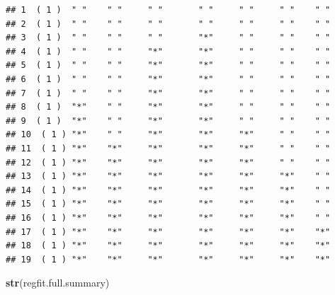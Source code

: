 \documentclass[
  12pt,
]{book}
\newenvironment{Shaded}{\begin{snugshade}}{\end{snugshade}}
\newcommand{\KeywordTok}[1]{\textcolor[rgb]{0.13,0.29,0.53}{\textbf{#1}}}
\newcommand{\NormalTok}[1]{#1}
\theoremstyle{definition}
\theoremstyle{definition}
\theoremstyle{definition}
\theoremstyle{remark}
\begin{document}
\begin{verbatim}
## 1  ( 1 )  " "    " "     " "       " "     " "     " "    " "       
## 2  ( 1 )  " "    " "     " "       " "     " "     " "    " "       
## 3  ( 1 )  " "    " "     " "       "*"     " "     " "    " "       
## 4  ( 1 )  " "    " "     "*"       "*"     " "     " "    " "       
## 5  ( 1 )  " "    " "     "*"       "*"     " "     " "    " "       
## 6  ( 1 )  " "    " "     "*"       "*"     " "     " "    " "       
## 7  ( 1 )  " "    " "     "*"       "*"     " "     " "    " "       
## 8  ( 1 )  "*"    " "     "*"       "*"     " "     " "    " "       
## 9  ( 1 )  "*"    " "     "*"       "*"     " "     " "    " "       
## 10  ( 1 ) "*"    " "     "*"       "*"     "*"     " "    " "       
## 11  ( 1 ) "*"    "*"     "*"       "*"     "*"     " "    " "       
## 12  ( 1 ) "*"    "*"     "*"       "*"     "*"     " "    " "       
## 13  ( 1 ) "*"    "*"     "*"       "*"     "*"     "*"    " "       
## 14  ( 1 ) "*"    "*"     "*"       "*"     "*"     "*"    " "       
## 15  ( 1 ) "*"    "*"     "*"       "*"     "*"     "*"    " "       
## 16  ( 1 ) "*"    "*"     "*"       "*"     "*"     "*"    " "       
## 17  ( 1 ) "*"    "*"     "*"       "*"     "*"     "*"    "*"       
## 18  ( 1 ) "*"    "*"     "*"       "*"     "*"     "*"    "*"       
## 19  ( 1 ) "*"    "*"     "*"       "*"     "*"     "*"    "*"
\end{verbatim}

\begin{Shaded}
\begin{Highlighting}[]
\KeywordTok{str}\NormalTok{(regfit.full.summary)}
\end{Highlighting}
\end{Shaded}
\end{document}
